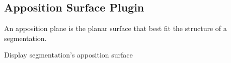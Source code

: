 \subsection{Apposition Surface Plugin}

An apposition plane is the planar surface that best fit the structure of a
segmentation.\\

\vspace{0.3cm}

{Display segmentation's apposition surface}
